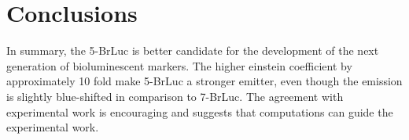 \documentclass[11pt]{article}
\begin{document}
\section{Conclusions}


In summary, the 5-BrLuc is better candidate for the development of
the next generation of bioluminescent markers. The higher einstein
coefficient by approximately 10 fold make 5-BrLuc a stronger
emitter, even though the emission is slightly blue-shifted in comparison
to 7-BrLuc. The agreement with experimental work is encouraging
and suggests that computations can guide the experimental
work.

%

\printbibliography
\end{document}
